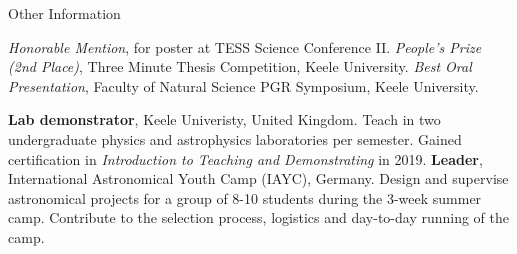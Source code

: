 \begin{rubric}{Other Information}

\entry*[2021]
    \textit{Honorable Mention}, for poster at TESS Science Conference II.
\entry*[2021]
    \textit{People's Prize (2nd Place)}, Three Minute Thesis Competition, Keele University.
\entry*[2021]
    \textit{Best Oral Presentation}, Faculty of Natural Science PGR Symposium, Keele University. 


%
    \textbf{Lab demonstrator}, Keele Univeristy, United Kingdom. Teach in two undergraduate physics and astrophysics laboratories per semester. Gained certification in \emph{Introduction to Teaching and Demonstrating} in 2019.
%
    \textbf{Leader}, International Astronomical Youth Camp (IAYC), Germany. Design and supervise astronomical projects for a group of 8-10 students during the 3-week summer camp. Contribute to the selection process, logistics and day-to-day running of the camp.%



\end{rubric}

